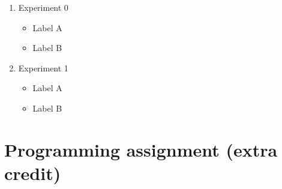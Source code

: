 \begin{enumerate}
      \begin{enumerate}

      \item Experiment 0
            \begin{itemize}
	    \item Label A
	    \item Label B
	    \end{itemize}

      \item Experiment 1
            \begin{itemize}
	    \item Label A
	    \item Label B
	    \end{itemize}

      \end{enumerate}

\end{enumerate}



\section{Programming assignment (extra credit)}

